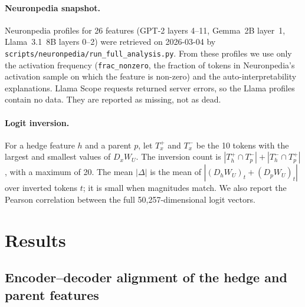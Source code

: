 \documentclass[11pt,a4paper]{article}
\begin{document}
\paragraph{Neuronpedia snapshot.} Neuronpedia \citep{neuronpedia} profiles for 26 features (GPT-2 layers 4--11, Gemma~2B layer~1, Llama~3.1~8B layers 0--2) were retrieved on 2026-03-04 by \nolinkurl{scripts/neuronpedia/run_full_analysis.py}. From these profiles we use only the activation frequency (\texttt{frac\_nonzero}, the fraction of tokens in Neuronpedia's activation sample on which the feature is non-zero) and the auto-interpretability explanations. Llama Scope requests returned server errors, so the Llama profiles contain no data. They are reported as missing, not as dead.

\paragraph{Logit inversion.} For a hedge feature $h$ and a parent $p$, let $T^{+}_x$ and $T^{-}_x$ be the 10 tokens with the largest and smallest values of $D_x W_U$. The inversion count is $|T^{+}_h \cap T^{-}_p| + |T^{-}_h \cap T^{+}_p|$, with a maximum of 20. The mean $|\Delta|$ is the mean of $|(D_h W_U)_t + (D_p W_U)_t|$ over inverted tokens $t$; it is small when magnitudes match. We also report the Pearson correlation between the full 50,257-dimensional logit vectors.

\section{Results}

\subsection{Encoder--decoder alignment of the hedge and parent features}
\end{document}
